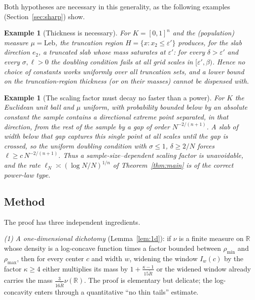 \documentclass[11pt]{article}
\newtheorem{example}[theorem]{Example}
\newcommand{\R}{\mathbb{R}}
\begin{document}
Both hypotheses are necessary in this generality, as the following examples
(Section~\ref{sec:sharp}) show.

\begin{example}[Thickness is necessary]\label{ex:sliver-intro}
For $K=[0,1]^n$ and the (population) measure $\mu=\mathrm{Leb}$, the truncation
region $H=\{x:x_2\le\varepsilon'\}$ produces, for the slab direction $e_2$, a
truncated slab whose mass saturates at $\varepsilon'$: for every
$\delta>\varepsilon'$ and every $\sigma,\ell>0$ the doubling condition fails at all
grid scales in $[\varepsilon',\beta)$.  Hence no choice of constants works uniformly
over all truncation sets, and a lower bound on the truncation-region thickness (or on
their masses) cannot be dispensed with.
\end{example}

\begin{example}[The scaling factor must decay no faster than a power]\label{ex:gap-intro}
For $K$ the Euclidean unit ball and $\mu$ uniform, with probability bounded below by
an absolute constant the sample contains a directional extreme point separated, in
that direction, from the rest of the sample by a gap of order $N^{-2/(n+1)}$.  A slab
of width below that gap captures this single point at all scales until the gap is
crossed, so the uniform doubling condition with $\sigma\le1$, $\delta\ge2/N$ forces
$\ell\ge c\,N^{-2/(n+1)}$.  Thus a sample-size--dependent scaling factor is
unavoidable, and the rate $\ell_N\asymp(\log N/N)^{1/n}$ of Theorem~\ref{thm:main}
is of the correct power-law type.
\end{example}

\subsection*{Method}

The proof has three independent ingredients.

\emph{(1) A one-dimensional dichotomy} (Lemma~\ref{lem:1d}): if $\nu$ is a finite
measure on $\R$ whose density is a log-concave function times a factor bounded
between $\rho_{\min}$ and $\rho_{\max}$, then for every center $c$ and width $w$,
widening the window $I_w(c)$ by the factor $\kappa\ge4$ either multiplies its mass by
$1+\frac{\kappa-1}{15\widetilde R}$ or the widened window already carries the mass
$\frac{3}{16\widetilde R}\nu(\R)$.  The proof is elementary but delicate; the
log-concavity enters through a quantitative ``no thin tails'' estimate.
\end{document}
